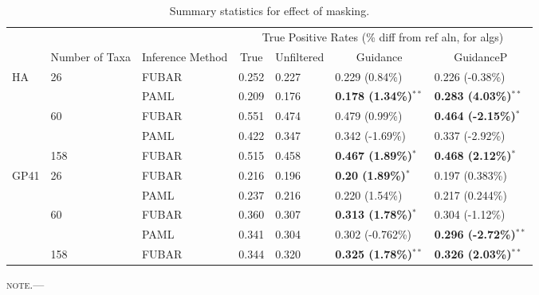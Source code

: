 \documentclass[11pt]{article}
\begin{document}

\begin{table}[htbp]
\begin{adjustwidth}{-1.75cm}{}
\caption {\label{tab:summarystats} Summary statistics for effect of masking.}
\begin{tabular}{l l l l l l l}
\hline\noalign{\smallskip}
& & & \multicolumn{4}{c}{True Positive Rates (\% diff from ref aln, for algs)} \\
\cline{4-7}\noalign{\smallskip}
\multicolumn{1}{c}{Selective Profile} & \multicolumn{1}{c}{Number of Taxa} & \multicolumn{1}{c}{Inference Method} & \multicolumn{1}{c}{True} & \multicolumn{1}{c}{Unfiltered} & \multicolumn{1}{c}{Guidance} & \multicolumn{1}{c}{GuidanceP} \\
\noalign{\smallskip}\hline\noalign{\smallskip}
HA & 26 & FUBAR & 0.252 & 0.227 & 0.229 (0.84\%) & 0.226 (-0.38\%) \\
 &   & PAML & 0.209 & 0.176 & \textbf{0.178 (1.34\%)}$^{\ast\ast}$ & \textbf{0.283 (4.03\%)}$^{\ast\ast}$ \\
\hline
 & 60 & FUBAR & 0.551 & 0.474 & 0.479 (0.99\%) & \textbf{0.464 (-2.15\%)}$^{\ast}$  \\
 &  & PAML & 0.422 & 0.347 & 0.342 (-1.69\%) & 0.337 (-2.92\%) \\
 \hline
 & 158 & FUBAR & 0.515 & 0.458 & \textbf{0.467 (1.89\%)}$^{\ast}$ & \textbf{0.468 (2.12\%)}$^{\ast}$ \\
\hline
GP41 & 26 & FUBAR & 0.216 & 0.196 & \textbf{0.20 (1.89\%)}$^{\ast}$ & 0.197 (0.383\%) \\
 & & PAML & 0.237 & 0.216 & 0.220 (1.54\%) & 0.217 (0.244\%) \\
 \hline
 & 60 & FUBAR & 0.360 & 0.307 & \textbf{0.313 (1.78\%)}$^{\ast}$ & 0.304 (-1.12\%)\\
 & & PAML & 0.341 & 0.304 & 0.302 (-0.762\%) & \textbf{0.296 (-2.72\%)}$^{\ast\ast}$ \\
 \hline
 & 158 & FUBAR & 0.344 & 0.320 & \textbf{0.325 (1.78\%)}$^{\ast\ast}$ & \textbf{0.326 (2.03\%)}$^{\ast\ast}$ \\
\hline
\end{tabular}
\newline
\textsc{note.}--- %
\end{adjustwidth}
\end{table}
\end{document}
